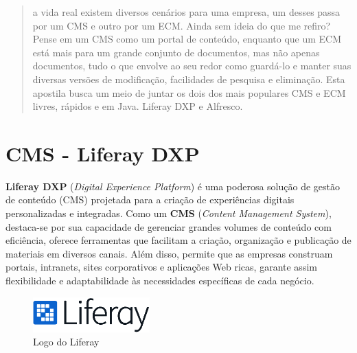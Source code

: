 \documentclass[a4paper,11pt]{article}
\begin{document}
	
\maketitle %
\thispagestyle{fancy} %


\begin{abstract}	
	a vida real existem diversos cenários para uma empresa, um desses passa por um CMS e outro por um ECM. Ainda sem ideia do que me refiro? Pense em um CMS como um portal de conteúdo, enquanto que um ECM está mais para um grande conjunto de documentos, mas não apenas documentos, tudo o que envolve ao seu redor como guardá-lo e manter suas diversas versões de modificação, facilidades de pesquisa e eliminação. Esta apostila busca um meio de juntar os dois dos mais populares CMS e ECM livres, rápidos e em Java. Liferay DXP e Alfresco.
\end{abstract}

\section{CMS - Liferay DXP}
\textbf{Liferay DXP} (\textit{Digital Experience Platform}) é uma poderosa solução de gestão de conteúdo (CMS) projetada para a criação de experiências digitais personalizadas e integradas. Como um \textbf{CMS} (\textit{Content Management System}), destaca-se por sua capacidade de gerenciar grandes volumes de conteúdo com eficiência, oferece ferramentas que facilitam a criação, organização e publicação de materiais em diversos canais. Além disso, permite que as empresas construam portais, intranets, sites corporativos e aplicações Web ricas, garante assim flexibilidade e adaptabilidade às necessidades específicas de cada negócio.
\begin{figure}[!htb]
	\centering
	\includegraphics[width=0.4\textwidth]{imagens/LogoLiferay}
	\caption{Logo do Liferay}
\end{figure}
\end{document}
